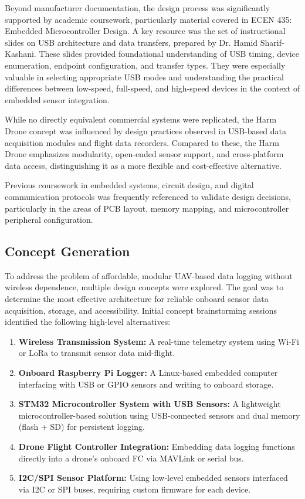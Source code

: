 \documentclass[12pt]{article}
\begin{document}
Beyond manufacturer documentation, the design process was significantly supported by academic coursework, particularly material covered in ECEN 435: Embedded Microcontroller Design. A key resource was the set of instructional slides on USB architecture and data transfers, prepared by Dr. Hamid Sharif-Kashani. These slides provided foundational understanding of USB timing, device enumeration, endpoint configuration, and transfer types. They were especially valuable in selecting appropriate USB modes and understanding the practical differences between low-speed, full-speed, and high-speed devices in the context of embedded sensor integration.

While no directly equivalent commercial systems were replicated, the Harm Drone concept was influenced by design practices observed in USB-based data acquisition modules and flight data recorders. Compared to these, the Harm Drone emphasizes modularity, open-ended sensor support, and cross-platform data access, distinguishing it as a more flexible and cost-effective alternative.

Previous coursework in embedded systems, circuit design, and digital communication protocols was frequently referenced to validate design decisions, particularly in the areas of PCB layout, memory mapping, and microcontroller peripheral configuration.

\subsection{Concept Generation}
To address the problem of affordable, modular UAV-based data logging without wireless dependence, multiple design concepts were explored. The goal was to determine the most effective architecture for reliable onboard sensor data acquisition, storage, and accessibility. Initial concept brainstorming sessions identified the following high-level alternatives:

\begin{enumerate}
    \item \textbf{Wireless Transmission System:} A real-time telemetry system using Wi-Fi or LoRa to transmit sensor data mid-flight.
    \item \textbf{Onboard Raspberry Pi Logger:} A Linux-based embedded computer interfacing with USB or GPIO sensors and writing to onboard storage.
    \item \textbf{STM32 Microcontroller System with USB Sensors:} A lightweight microcontroller-based solution using USB-connected sensors and dual memory (flash + SD) for persistent logging.
    \item \textbf{Drone Flight Controller Integration:} Embedding data logging functions directly into a drone's onboard FC via MAVLink or serial bus.
    \item \textbf{I2C/SPI Sensor Platform:} Using low-level embedded sensors interfaced via I2C or SPI buses, requiring custom firmware for each device.
\end{enumerate}
\end{document}
